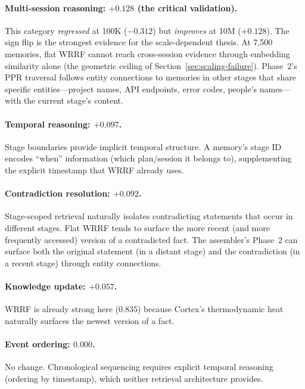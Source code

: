 \documentclass[11pt]{article}
\begin{document}
\paragraph{Multi-session reasoning: $+0.128$ (the critical validation).}
This category \emph{regressed} at 100K ($-0.312$) but \emph{improves}
at 10M ($+0.128$).  The sign flip is the strongest evidence for the
scale-dependent thesis.  At 7,500 memories, flat WRRF cannot reach
cross-session evidence through embedding similarity alone (the
geometric ceiling of Section~\ref{sec:scaling-failure}).  Phase~2's
PPR traversal follows entity connections to memories in other stages
that share specific entities---project names, API endpoints, error
codes, people's names---with the current stage's content.

\paragraph{Temporal reasoning: $+0.097$.}
Stage boundaries provide implicit temporal structure.  A memory's
stage ID encodes ``when'' information (which plan/session it belongs
to), supplementing the explicit timestamp that WRRF already uses.

\paragraph{Contradiction resolution: $+0.092$.}
Stage-scoped retrieval naturally isolates contradicting statements
that occur in different stages.  Flat WRRF tends to surface the more
recent (and more frequently accessed) version of a contradicted fact.
The assembler's Phase~2 can surface both the original statement (in
a distant stage) and the contradiction (in a recent stage) through
entity connections.

\paragraph{Knowledge update: $+0.057$.}
WRRF is already strong here (0.835) because Cortex's thermodynamic
heat naturally surfaces the newest version of a fact.

\paragraph{Event ordering: $0.000$.}
No change.  Chronological sequencing requires explicit temporal
reasoning (ordering by timestamp), which neither retrieval
architecture provides.
\end{document}
